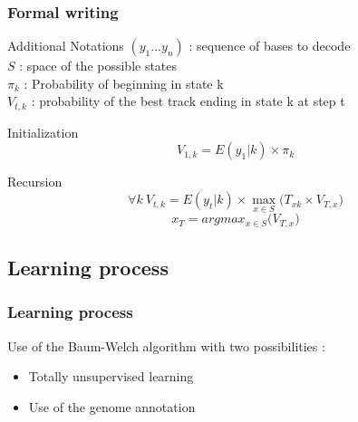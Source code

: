 \documentclass{beamer}
\begin{document}
\begin{frame}
\frametitle{Formal writing}

\begin{block}{Additional Notations}
$(y_1...y_n)$ : sequence of bases to decode\\
$S$ : space of the possible states\\
$\pi_{k}$ : Probability of beginning in state k\\
$V_{t,k}$ : probability of the best track ending in state k at step t
\end{block}

\begin{block}{Initialization}
\begin{equation*}
V_{1,k} = E(y_1|k)\times\pi_{k}
\end{equation*}
\end{block}

\begin{block}{Recursion}
\begin{equation*}
\forall k\ V_{t,k} = E(y_t|k)\times\max_{x \in S}\big(T_{xk}\times V_{T,x}\big)
\end{equation*}
\begin{equation*}
x_{T} = argmax_{x \in S}\big(V_{T,x}\big)
\end{equation*}
\end{block}

\end{frame}

\subsection{Learning process}

\begin{frame}
\frametitle{Learning process}
Use of the Baum-Welch algorithm with two possibilities :

\vspace{0.5 cm}

\begin{itemize}
	\item Totally unsupervised learning
	\item Use of the genome annotation  
\end{itemize}


\end{frame}
\end{document}
